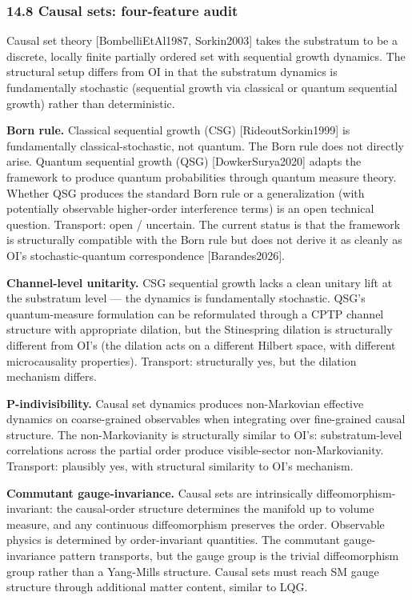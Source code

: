 \documentclass[
]{article}
\begin{document}
\hypertarget{causal-sets-four-feature-audit}{%
\subsubsection{14.8 Causal sets: four-feature
audit}\label{causal-sets-four-feature-audit}}

Causal set theory {[}BombelliEtAl1987, Sorkin2003{]} takes the
substratum to be a discrete, locally finite partially ordered set with
sequential growth dynamics. The structural setup differs from OI in that
the substratum dynamics is fundamentally stochastic (sequential growth
via classical or quantum sequential growth) rather than deterministic.

\textbf{Born rule.} Classical sequential growth (CSG)
{[}RideoutSorkin1999{]} is fundamentally classical-stochastic, not
quantum. The Born rule does not directly arise. Quantum sequential
growth (QSG) {[}DowkerSurya2020{]} adapts the framework to produce
quantum probabilities through quantum measure theory. Whether QSG
produces the standard Born rule or a generalization (with potentially
observable higher-order interference terms) is an open technical
question. Transport: open / uncertain. The current status is that the
framework is structurally compatible with the Born rule but does not
derive it as cleanly as OI's stochastic-quantum correspondence
{[}Barandes2026{]}.

\textbf{Channel-level unitarity.} CSG sequential growth lacks a clean
unitary lift at the substratum level --- the dynamics is fundamentally
stochastic. QSG's quantum-measure formulation can be reformulated
through a CPTP channel structure with appropriate dilation, but the
Stinespring dilation is structurally different from OI's (the dilation
acts on a different Hilbert space, with different microcausality
properties). Transport: structurally yes, but the dilation mechanism
differs.

\textbf{P-indivisibility.} Causal set dynamics produces non-Markovian
effective dynamics on coarse-grained observables when integrating over
fine-grained causal structure. The non-Markovianity is structurally
similar to OI's: substratum-level correlations across the partial order
produce visible-sector non-Markovianity. Transport: plausibly yes, with
structural similarity to OI's mechanism.

\textbf{Commutant gauge-invariance.} Causal sets are intrinsically
diffeomorphism-invariant: the causal-order structure determines the
manifold up to volume measure, and any continuous diffeomorphism
preserves the order. Observable physics is determined by order-invariant
quantities. The commutant gauge-invariance pattern transports, but the
gauge group is the trivial diffeomorphism group rather than a Yang-Mills
structure. Causal sets must reach SM gauge structure through additional
matter content, similar to LQG.
\end{document}
